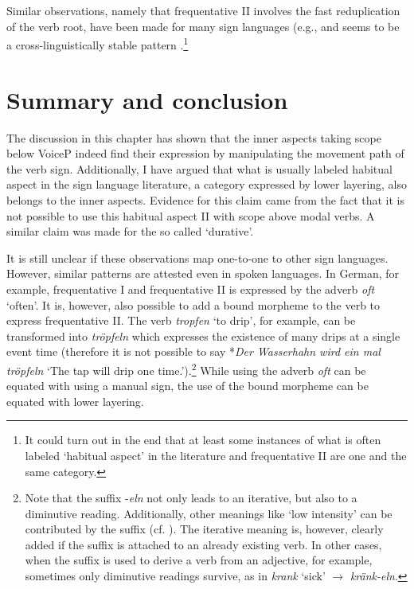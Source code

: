 \noindent Similar observations, namely that frequentative II involves the fast reduplication of the verb root, have been made for many sign languages (e.g., \citealt{bergmandahl1994, sutton1999linguistics, meir2007language} and seems to be a cross-linguistically stable pattern \citep[227]{signgram2017}.\footnote{ It could turn out in the end that at least some instances of what is often labeled `habitual aspect' in the literature and frequentative II are one and the same category. }


\section{Summary and conclusion}
The discussion in this chapter has shown that the inner aspects taking scope below VoiceP indeed find their expression by manipulating the movement path of the verb sign. Additionally, I have argued that what is usually labeled habitual aspect in the sign language literature, a category expressed by lower layering, also belongs to the inner aspects. Evidence for this claim came from the fact that it is not possible to use this habitual aspect II with scope above modal verbs. A similar claim was made for the so called `durative'. 

It is still unclear if these observations map one-to-one to other sign languages. However, similar patterns are attested even in spoken languages. In German, for example, frequentative I and frequentative II is expressed by the adverb \textit{oft} `often'. It is, however, also possible to add a bound morpheme to the verb to express frequentative II. The verb \textit{tropfen} `to drip', for example, can be transformed into \textit{tröpfeln} which expresses the existence of many drips at a single event time (therefore it is not possible to say *\textit{Der Wasserhahn wird ein mal tröpfeln} `The tap will drip one time.').\footnote{ Note that the suffix -\textit{eln} not only leads to an iterative, but also to a diminutive reading. Additionally, other meanings like `low intensity' can be contributed by the suffix (cf. \citealt{weidhaasschmid2015diminutiv}). The iterative meaning is, however, clearly added if the suffix is attached to an already existing verb. In other cases, when the suffix is used to derive a verb from an adjective, for example, sometimes only diminutive readings survive, as in \textit{krank} `sick' $\rightarrow$ \textit{kränk-eln}.} While using the adverb \textit{oft} can be equated with using a manual sign, the use of the bound morpheme can be equated with lower layering.

